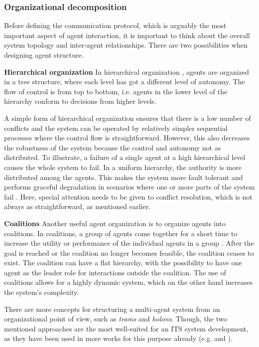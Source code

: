 \documentclass[0main.tex]{subfiles}
\begin{document}
\subsubsection{Organizational decomposition}\label{sec-conflicts}

Before defining the communication protocol, which is arguably the most important aspect of agent 
interaction, it is important to think about the overall system topology and inter-agent 
relationships. There are two possibilities when designing agent structure.

\textbf{Hierarchical organization}\newline
In hierarchical organization \cite{Damba2007}, agents are organized in a tree structure,
where each level has got a different level of autonomy. The flow of control is 
from top to bottom, i.e. agents in the lower level of the hierarchy conform to decisions 
from higher levels. 

A simple form of hierarchical organization ensures that there is a low number of conflicts and
the system can be operated by relatively simpler sequential processes where the control flow
is straightforward. However, this also decreases the robustness of the system because the
control and autonomy not as distributed. To illustrate, a failure of a single agent at a high
hierarchical level causes the whole system to fail. In a 
uniform hierarchy, the authority is more distributed among the agents. This makes the
system more fault tolerant and performs graceful degradation in scenarios where one or more
parts of the system fail \cite{ParasumannaGokulan2010}. Here, special attention needs to be
given to conflict resolution, which is not always as straightforward, as mentioned earlier. 

\textbf{Coalitions}\newline
Another useful agent organization is to organize agents into coalitions. In coalitions, a group of
agents come together for a short time to increase the utility or performance of the individual
agents in a group \cite{ParasumannaGokulan2010}. After the goal is reached or the coalition no 
longer becomes feasible, the coalition ceases to exist. The coalition can have a flat hierarchy, 
with the possibility to have one agent as the leader role for interactions outside the coalition. 
The use of coalitions allows for a highly dynamic system, which on the other hand increases the
system's complexity. 

There are more concepts for structuring a multi-agent system from an organizational point of view, 
such as \emph{teams} and \emph{holons}. Though, the two mentioned approaches are the most well-suited for 
an ITS system development, as they have been used in more works for this purpose already 
(e.g. \cite{Balaji2007} and \cite{Vijsel2004}). 
\end{document}
